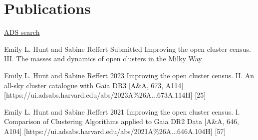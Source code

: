 \section*{Publications}

\href{\cvADSLink}{ADS search \faLink}%


\begin{etaremune}
    \item \publication
        {Emily L. Hunt and Sabine Reffert}
        {Submitted}
        {Improving the open cluster census. III. The masses and dynamics of open clusters in the Milky Way}
    \item \publication
        {Emily L. Hunt and Sabine Reffert}
        {2023}
        {Improving the open cluster census. II. An all-sky cluster catalogue with Gaia DR3}
        [A\&A, 673, A114]
        [https://ui.adsabs.harvard.edu/abs/2023A\%26A...673A.114H]
        [25]
    \item \publication
        {Emily L. Hunt and Sabine Reffert}
        {2021}
        {Improving the open cluster census. I. Comparison of Clustering Algorithms applied to Gaia DR2 Data}
        [A\&A, 646, A104]
        [https://ui.adsabs.harvard.edu/abs/2021A\%26A...646A.104H]
        [57]
\end{etaremune}
